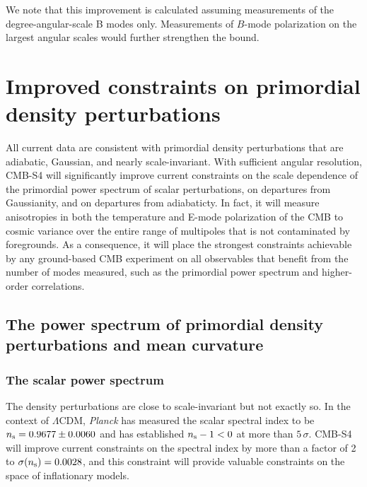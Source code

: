 We note that this improvement is calculated assuming measurements of the degree-angular-scale B modes only. Measurements of $B$-mode polarization on the largest angular scales would further strengthen the bound. 



\section{Improved constraints on primordial density perturbations}
\label{sec:scalar}
All current data are consistent with primordial density perturbations that are adiabatic, Gaussian, and nearly scale-invariant. With sufficient angular resolution, CMB-S4 will significantly improve current constraints on the scale dependence of the primordial power spectrum of scalar perturbations, on departures from Gaussianity, and on departures from adiabaticty. In fact, it will measure anisotropies in both the temperature and E-mode polarization of the CMB to cosmic variance over the entire range of multipoles that is not contaminated by foregrounds. As a consequence, it will place the strongest constraints achievable by any ground-based CMB experiment on all observables that benefit from the number of modes measured, such as the primordial power spectrum and higher-order correlations.

\subsection{The power spectrum of primordial density perturbations and mean curvature}

\subsubsection{The scalar power spectrum}
The density perturbations are close to scale-invariant but not exactly so. In the context of $\Lambda$CDM, {\it Planck\/} has measured the scalar spectral index to be $n_{\rm s}=0.9677\pm0.0060$ and has established $n_{\rm s}-1<0$ at more than $5\,\sigma$. CMB-S4 will improve current constraints on the spectral index by more than a factor of 2 to $\sigma(n_{\rm s})=0.0028$, and this constraint will provide valuable constraints on the space of inflationary models. 

